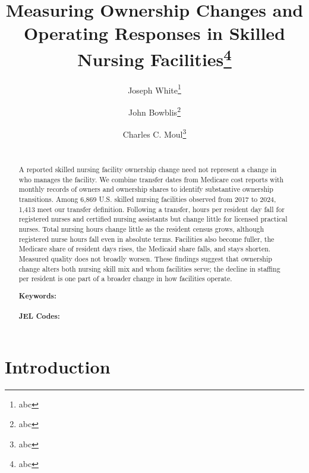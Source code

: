 \documentclass[12pt]{article}
\begin{document}
\begin{titlepage}
\title{Measuring Ownership Changes and Operating Responses in Skilled Nursing Facilities\thanks{abc}}

\author{
  Joseph White\thanks{abc}
  \and
  John Bowblis\thanks{abc}
  \and
  Charles C. Moul\thanks{abc}
}

\date{\DTMtoday}

\maketitle

\begin{abstract}
\noindent  \\  A reported skilled nursing facility ownership change need not represent a change in who manages the facility. We combine transfer dates from Medicare cost reports with monthly records of owners and ownership shares to identify substantive ownership transitions. Among 6,869 U.S. skilled nursing facilities observed from 2017 to 2024, 1,413 meet our transfer definition. Following a transfer, hours per resident day fall for registered nurses and certified nursing assistants but change little for licensed practical nurses. Total nursing hours change little as the resident census grows, although registered nurse hours fall even in absolute terms. Facilities also become fuller, the Medicare share of resident days rises, the Medicaid share falls, and stays shorten. Measured quality does not broadly worsen. These findings suggest that ownership change alters both nursing skill mix and whom facilities serve; the decline in staffing per resident is one part of a broader change in how facilities operate.

\noindent\textbf{Keywords:} \\
\vspace{0in}\\
\noindent\textbf{JEL Codes:} \\

\bigskip
\end{abstract}
\setcounter{page}{0}
\thispagestyle{empty}
\end{titlepage}
\pagebreak \newpage

\doublespacing

\section{Introduction} \label{sec:introduction}
\end{document}
